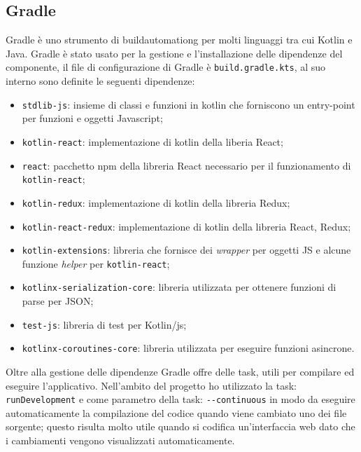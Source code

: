\subsection{Gradle}
Gradle è uno strumento di \gls{buildautomationg} per molti linguaggi tra cui Kotlin e Java. Gradle è stato usato per la gestione e l'installazione delle dipendenze del componente, il file di configurazione di Gradle è \verb|build.gradle.kts|, al suo interno sono definite le seguenti dipendenze:
\begin{itemize}
	\item \verb|stdlib-js|: insieme di classi e funzioni in kotlin che forniscono un entry-point per funzioni e oggetti Javascript;
	
	\item \verb|kotlin-react|: implementazione di kotlin della liberia React;
	
	\item \verb|react|: pacchetto npm della libreria React necessario per il funzionamento di \verb|kotlin-react|;
	
	\item \verb|kotlin-redux|: implementazione di kotlin della libreria Redux;
	
	\item \verb|kotlin-react-redux|: implementazione di kotlin della libreria React, Redux;
	
	\item \verb|kotlin-extensions|: libreria che fornisce dei \emph{wrapper} per oggetti JS e alcune funzione \emph{helper} per \verb|kotlin-react|;
	
	\item \verb|kotlinx-serialization-core|: libreria utilizzata per ottenere funzioni di parse per JSON;
	
	\item \verb|test-js|: libreria di test per Kotlin/js;
	
	\item \verb|kotlinx-coroutines-core|: libreria utilizzata per eseguire funzioni asincrone.
\end{itemize}
\noindent
Oltre alla gestione delle dipendenze Gradle offre delle task, utili per compilare ed eseguire l'applicativo. Nell'ambito del progetto ho utilizzato la task: \verb|runDevelopment| e come parametro della task: \verb|--continuous| in modo da eseguire automaticamente la compilazione del codice quando viene cambiato uno dei file sorgente; questo risulta molto utile quando si codifica un'interfaccia web dato che i cambiamenti vengono visualizzati automaticamente.

